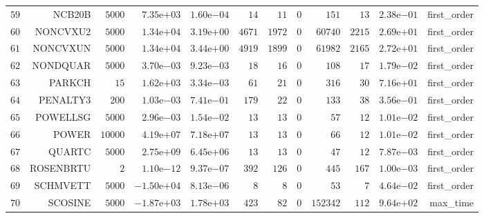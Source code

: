 \begin{longtable}{rrrrrrrrrrrr}
  \(    59\) & NCB20B & \(  5000\) & \( 7.35\)e\(+03\) & \( 1.60\)e\(-04\) & \(    14\) & \(    11\) & \(     0\) & \(   151\) & \(    13\) & \( 2.38\)e\(-01\) & first\_order \\
  \(    60\) & NONCVXU2 & \(  5000\) & \( 1.34\)e\(+04\) & \( 3.19\)e\(+00\) & \(  4671\) & \(  1972\) & \(     0\) & \( 60740\) & \(  2215\) & \( 2.69\)e\(+01\) & first\_order \\
  \(    61\) & NONCVXUN & \(  5000\) & \( 1.34\)e\(+04\) & \( 3.44\)e\(+00\) & \(  4919\) & \(  1899\) & \(     0\) & \( 61982\) & \(  2165\) & \( 2.72\)e\(+01\) & first\_order \\
  \(    62\) & NONDQUAR & \(  5000\) & \( 3.70\)e\(-03\) & \( 9.23\)e\(-03\) & \(    18\) & \(    16\) & \(     0\) & \(   108\) & \(    17\) & \( 1.79\)e\(-02\) & first\_order \\
  \(    63\) & PARKCH & \(    15\) & \( 1.62\)e\(+03\) & \( 3.34\)e\(-03\) & \(    61\) & \(    21\) & \(     0\) & \(   316\) & \(    30\) & \( 7.16\)e\(+01\) & first\_order \\
  \(    64\) & PENALTY3 & \(   200\) & \( 1.03\)e\(-03\) & \( 7.41\)e\(-01\) & \(   179\) & \(    22\) & \(     0\) & \(   133\) & \(    38\) & \( 3.56\)e\(-01\) & first\_order \\
  \(    65\) & POWELLSG & \(  5000\) & \( 2.96\)e\(-03\) & \( 1.54\)e\(-02\) & \(    13\) & \(    13\) & \(     0\) & \(    57\) & \(    12\) & \( 1.01\)e\(-02\) & first\_order \\
  \(    66\) & POWER & \( 10000\) & \( 4.19\)e\(+07\) & \( 7.18\)e\(+07\) & \(    13\) & \(    13\) & \(     0\) & \(    66\) & \(    12\) & \( 1.01\)e\(-02\) & first\_order \\
  \(    67\) & QUARTC & \(  5000\) & \( 2.75\)e\(+09\) & \( 6.45\)e\(+06\) & \(    13\) & \(    13\) & \(     0\) & \(    47\) & \(    12\) & \( 7.87\)e\(-03\) & first\_order \\
  \(    68\) & ROSENBRTU & \(     2\) & \( 1.10\)e\(-12\) & \( 9.37\)e\(-07\) & \(   392\) & \(   126\) & \(     0\) & \(   445\) & \(   167\) & \( 1.00\)e\(-03\) & first\_order \\
  \(    69\) & SCHMVETT & \(  5000\) & \(-1.50\)e\(+04\) & \( 8.13\)e\(-06\) & \(     8\) & \(     8\) & \(     0\) & \(    53\) & \(     7\) & \( 4.64\)e\(-02\) & first\_order \\
  \(    70\) & SCOSINE & \(  5000\) & \(-1.87\)e\(+03\) & \( 1.78\)e\(+03\) & \(   423\) & \(    82\) & \(     0\) & \(152342\) & \(   112\) & \( 9.64\)e\(+02\) & max\_time \\

\end{longtable}
